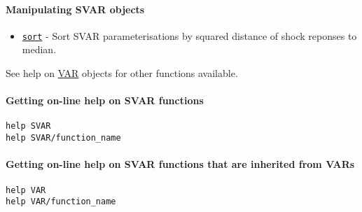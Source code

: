 \paragraph{Manipulating SVAR objects}\label{manipulating-svar-objects}

\begin{itemize}
\itemsep1pt\parskip0pt
\item
  \href{SVAR/sort}{\texttt{sort}} - Sort SVAR parameterisations by
  squared distance of shock reponses to median.
\end{itemize}

See help on \href{VAR/Contents}{VAR} objects for other functions
available.

\paragraph{Getting on-line help on SVAR
functions}\label{getting-on-line-help-on-svar-functions}

\begin{verbatim}
help SVAR
help SVAR/function_name
\end{verbatim}

\paragraph{Getting on-line help on SVAR functions that are inherited
from
VARs}\label{getting-on-line-help-on-svar-functions-that-are-inherited-from-vars}

\begin{verbatim}
help VAR
help VAR/function_name
\end{verbatim}



